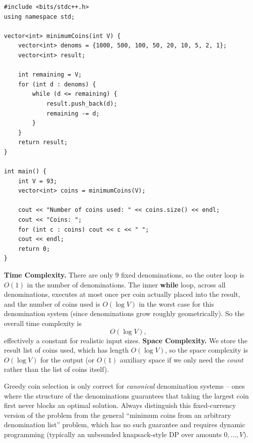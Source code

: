 \begin{lstlisting}
#include <bits/stdc++.h>
using namespace std;

vector<int> minimumCoins(int V) {
    vector<int> denoms = {1000, 500, 100, 50, 20, 10, 5, 2, 1};
    vector<int> result;

    int remaining = V;
    for (int d : denoms) {
        while (d <= remaining) {
            result.push_back(d);
            remaining -= d;
        }
    }
    return result;
}

int main() {
    int V = 93;
    vector<int> coins = minimumCoins(V);

    cout << "Number of coins used: " << coins.size() << endl;
    cout << "Coins: ";
    for (int c : coins) cout << c << " ";
    cout << endl;
    return 0;
}
\end{lstlisting}

\begin{complexitybox}
\textbf{Time Complexity.} There are only $9$ fixed denominations, so the
outer loop is $O(1)$ in the number of denominations. The inner
\textbf{while} loop, across all denominations, executes at most once per
coin actually placed into the result, and the number of coins used is
$O(\log V)$ in the worst case for this denomination system (since
denominations grow roughly geometrically). So the overall time complexity is
\[
  O(\log V),
\]
effectively a constant for realistic input sizes.
\textbf{Space Complexity.} We store the result list of coins used, which has
length $O(\log V)$, so the space complexity is $O(\log V)$ for the output
(or $O(1)$ auxiliary space if we only need the \emph{count} rather than the
list of coins itself).
\end{complexitybox}

\begin{takeawaybox}
Greedy coin selection is only correct for \emph{canonical} denomination
systems -- ones where the structure of the denominations guarantees that
taking the largest coin first never blocks an optimal solution. Always
distinguish this fixed-currency version of the problem from the general
``minimum coins from an arbitrary denomination list'' problem, which has no
such guarantee and requires dynamic programming (typically an unbounded
knapsack-style DP over amounts $0, \dots, V$).
\end{takeawaybox}
